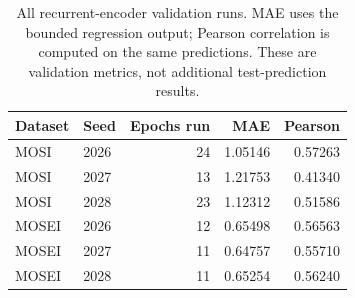 \begin{table}[!htbp]
\centering\small
\caption{All recurrent-encoder validation runs. MAE uses the bounded regression output; Pearson correlation is computed on the same predictions. These are validation metrics, not additional test-prediction results.}
\label{tab:recurrent-validation}
\begin{tabular}{llrrr}
\toprule
Dataset & Seed & Epochs run & MAE & Pearson \\
\midrule
MOSI & 2026 & 24 & 1.05146 & 0.57263 \\
MOSI & 2027 & 13 & 1.21753 & 0.41340 \\
MOSI & 2028 & 23 & 1.12312 & 0.51586 \\
MOSEI & 2026 & 12 & 0.65498 & 0.56563 \\
MOSEI & 2027 & 11 & 0.64757 & 0.55710 \\
MOSEI & 2028 & 11 & 0.65254 & 0.56240 \\
\bottomrule
\end{tabular}
\end{table}
